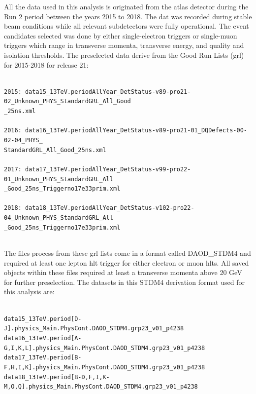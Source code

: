 All the data used in this analysis is originated from the \gls{atlas} detector during the Run 2 period between the years 2015 to 2018. The dat was recorded during stable beam conditions 
while all relevant subdetectors were fully operational. The event candidates selected was done by either single-electron triggers or single-muon triggers which range in transverse momenta, 
transverse energy, and quality and isolation thresholds. The preselected data derive from the Good Run Lists (\gls{grl}) for 2015-2018 for release 21:
\\
\\
\begin{footnotesize}
\texttt{2015: data15\_13TeV.periodAllYear\_DetStatus-v89-pro21-02\_Unknown\_PHYS\_StandardGRL\_All\_Good\\\_25ns.xml} \\
\\
\texttt{2016: data16\_13TeV.periodAllYear\_DetStatus-v89-pro21-01\_DQDefects-00-02-04\_PHYS\_\\StandardGRL\_All\_Good\_25ns.xml} \\
\\
\texttt{2017: data17\_13TeV.periodAllYear\_DetStatus-v99-pro22-01\_Unknown\_PHYS\_StandardGRL\_All\\\_Good\_25ns\_Triggerno17e33prim.xml} \\
\\
\texttt{2018: data18\_13TeV.periodAllYear\_DetStatus-v102-pro22-04\_Unknown\_PHYS\_StandardGRL\_All\\\_Good\_25ns\_Triggerno17e33prim.xml}\\
\end{footnotesize}
\\
The files process from these \gls{grl} lists come in a format called DAOD\_STDM4 and required at least one lepton \gls{hlt} trigger for either electron or muon \gls{hlt}s. All saved objects 
within these files required at least a transverse momenta above 20 GeV for further preselection. The datasets in this STDM4 derivation format used for this analysis are:
\\
\\
\begin{footnotesize}
\texttt{data15\_13TeV.period[D-J].physics\_Main.PhysCont.DAOD\_STDM4.grp23\_v01\_p4238} \\
\texttt{data16\_13TeV.period[A-G,I,K,L].physics\_Main.PhysCont.DAOD\_STDM4.grp23\_v01\_p4238} \\
\texttt{data17\_13TeV.period[B-F,H,I,K].physics\_Main.PhysCont.DAOD\_STDM4.grp23\_v01\_p4238} \\
\texttt{data18\_13TeV.period[B-D,F,I,K-M,O,Q].physics\_Main.PhysCont.DAOD\_STDM4.grp23\_v01\_p4238} \\
\end{footnotesize}
